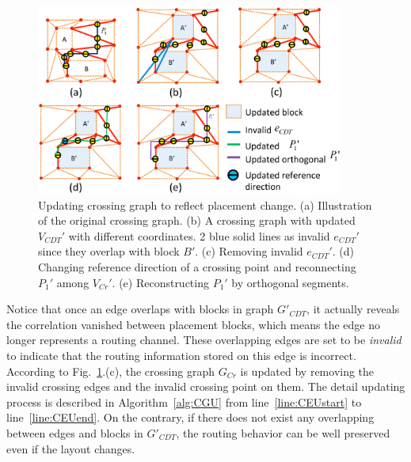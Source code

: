      \begin{figure}[ht]
        \begin{center}
        \includegraphics[width=0.9\textwidth]{Fig/Chapter4/UCG.eps}
        \caption{
          Updating crossing graph to reflect placement change.
          (a) Illustration of the original crossing graph.
          (b) A crossing graph with updated $V_{CDT}'$ with different coordinates. 2 blue solid lines as invalid $e_{CDT}'$ since they overlap with block $B'$.
          (c) Removing invalid $e_{CDT}'$.
          (d) Changing reference direction of a crossing point and reconnecting $P_1'$ among $V_{Cr}'$. 
          (e) Reconstructing $P_1'$ by orthogonal segments.
        }
        \label{fig:CGU}
        \end{center}
      \end{figure}


      Notice that once an edge overlaps with blocks in graph $G'_{CDT}$, it actually reveals the correlation vanished between placement blocks, 
      which means the edge no longer represents a routing channel.
      These overlapping edges are set to be {\it invalid} to indicate that the routing information stored on this edge is incorrect.
      According to Fig.~\ref{fig:CGU}.(c), the crossing graph $G_{Cr}$ is updated by removing the invalid crossing edges and the invalid crossing point on them. The detail updating process is described in Algorithm~\ref{alg:CGU} from line~\ref{line:CEUstart} to line~\ref{line:CEUend}.
      On the contrary, if there does not exist any overlapping between edges and blocks in $G'_{CDT}$, the routing behavior can be well preserved even if the layout changes.

        


